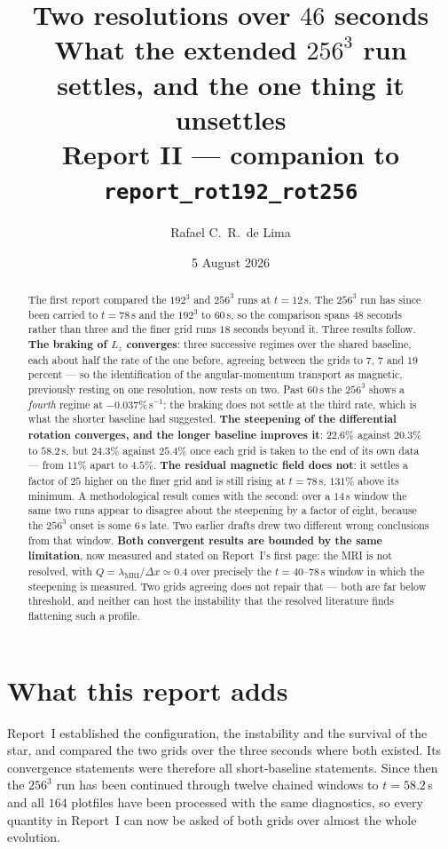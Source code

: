 \documentclass[11pt,a4paper]{article}
\title{\textbf{Two resolutions over $46$ seconds}\\[0.3em]
\large What the extended $256^3$ run settles, and the one thing it unsettles\\[0.2em]
\normalsize Report II --- companion to \texttt{report\_rot192\_rot256}}
\author{Rafael C.\ R.\ de Lima}
\date{5 August 2026}
\begin{document}
\maketitle

\begin{abstract}
\noindent
The first report compared the $192^3$ and $256^3$ runs at $t = 12$\,s. The
$256^3$ run has since been carried to $t = 78$\,s and the $192^3$ to $60$\,s,
so the comparison spans $48$ seconds rather than three and the finer grid runs
$18$ seconds beyond it. Three results follow. \textbf{The
braking of $L_z$ converges}: three successive regimes over the shared baseline,
each about half the rate of the one before, agreeing between the grids to $7$,
$7$ and $19$ percent --- so the identification of the angular-momentum transport
as magnetic, previously resting on one resolution, now rests on two. Past
$60$\,s the $256^3$ shows a \emph{fourth} regime at $-0.037\%$\,s$^{-1}$: the
braking does not settle at the third rate, which is what the shorter baseline
had suggested. \textbf{The steepening of the differential rotation converges,
and the longer baseline improves it}: $22.6\%$ against $20.3\%$ to $58.2$\,s,
but $24.3\%$ against $25.4\%$ once each grid is taken to the end of its own
data --- from $11\%$ apart to $4.5\%$. \textbf{The residual magnetic field does not}: it settles a factor of
$25$ higher on the finer grid and is still rising at $t = 78$\,s, $131\%$ above
its minimum. A
methodological result comes with the second: over a $14$\,s window the same two
runs appear to disagree about the steepening by a factor of eight, because the
$256^3$ onset is some $6$\,s late. Two earlier drafts drew two different wrong
conclusions from that window. \textbf{Both convergent results are bounded by the
same limitation}, now measured and stated on Report~I's first page: the MRI is
not resolved, with $Q = \lambda_{\mathrm{MRI}}/\Delta x \simeq 0.4$ over
precisely the $t = 40$--$78$\,s window in which the steepening is measured. Two
grids agreeing does not repair that --- both are far below threshold, and
neither can host the instability that the resolved literature finds flattening
such a profile.
\end{abstract}

\section{What this report adds}

Report~I established the configuration, the instability and the survival of the
star, and compared the two grids over the three seconds where both existed. Its
convergence statements were therefore all short-baseline statements. Since then
the $256^3$ run has been continued through twelve chained windows to
$t = 58.2$\,s and all $164$ plotfiles have been processed with the same
diagnostics, so every quantity in Report~I can now be asked of both grids over
almost the whole evolution.
\end{document}
